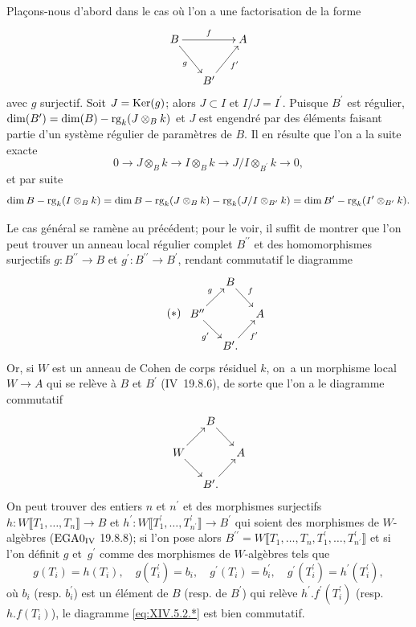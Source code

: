 Pla\c cons-nous d'abord dans le cas o\`u l'on a une factorisation de
la forme
$$
\xymatrix@C=15pt{ B\ar[rr]^-{f}\ar[rd]_-{g} & & A\\
& B^{\prime}\ar[ru]_-{f^{\prime}} & }$$
avec $g$ surjectif. Soit $J=\operatorname{Ker}(g)$; alors $J\subset I$ et $I/J=I^{\prime}$. Puisque $B^{\prime}$ est r\'egulier, $\dim(B^{\prime})=\dim(B)-\operatorname{rg}_{k}(J\otimes_{B}k)$ et $J$ est engendr\'e par des \'el\'ements faisant partie d'un syst\`eme r\'egulier de param\`etres de $B$. Il en r\'esulte que l'on a la suite exacte
$$0\to J\otimes_{B}k\to I\otimes_{B}k\to J/I\otimes_{B^{\prime}}k\to 0,
$$
et par suite
$$
\dim B-\operatorname{rg}_{k}(I\otimes_{B}k)=\dim B-\operatorname{rg}_{k}(J\otimes_{B}k)-\operatorname{rg}_{k}(J/I\otimes_{B^{\prime}}k)=\dim B^{\prime}-\operatorname{rg}_{k}(I^{\prime}\otimes_{B^{\prime}}k).
$$

Le cas g\'en\'eral se ram\`ene au pr\'ec\'edent; pour le voir, il suffit de montrer que l'on peut trouver un anneau local r\'egulier complet $B^{\prime\prime}$ et des homomorphismes surjectifs $g\colon B^{\prime\prime}\to B$ et $g^{\prime}\colon B^{\prime\prime}\to B^{\prime}$, rendant commutatif le diagramme
\begin{equation*} \label{eq:XIV.5.2.*} \tag{$*$}
\begin{array}{c}
\xymatrix@C=10pt@R=15pt{ & B\ar[rd]^-{f} & \\
B^{\prime\prime}\ar[ru]^-{g}\ar[rd]_-{g^{\prime}} & & A\\
& B^{\prime}.\ar[ru]_-{f^{\prime}} &
}
\end{array}
\end{equation*}
Or, si $W$ est un anneau de Cohen de corps r\'esiduel $k$, on~a un morphisme local $W\to A$ qui se rel\`eve \`a $B$ et $B^{\prime}$ (\EGA IV~19.8.6), de sorte que l'on a le diagramme commutatif
$$
\xymatrix@R=15pt@C=10pt{ & B\ar[rd] & \\
W\ar[ru]\ar[rd] & & A\\
& B^{\prime}.\ar[ru] & }$$
On peut trouver des entiers $n$ et $n^{\prime}$ et des morphismes surjectifs \hbox{$h\colon W\llbracket T_{1},\dots, T_{n}\rrbracket\!\to\! B$} et $h^{\prime}\colon W\llbracket T_{1}^{\prime},\dots, T_{n^{\prime}}^{\prime}\rrbracket\to B^{\prime}$ qui soient des morphismes de $W$-alg\`ebres ($\textup{EGA}\space 0_{\textup{IV}}$ 19.8.8); si l'on pose alors $B^{\prime\prime}=W\llbracket T_{1},\dots, T_{n}, T_{1}^{\prime},\dots, T_{n^{\prime}}^{\prime}\rrbracket$ et si l'on d\'efinit $g$ et~$g^{\prime}$ comme des morphismes de $W$-alg\`ebres tels que
$$g(T_{i})=h(T_{i}), \quad g(T_{i}^{\prime})=b_{i}, \quad g^{\prime}(T_{i})=b_{i}^{\prime}, \quad g^{\prime}(T_{i}^{\prime})=h^{\prime}(T_{i}^{\prime}),
$$
o\`u $b_{i}$ (resp. $b_{i}^{\prime}$) est un \'el\'ement de $B$ (resp. de $B^{\prime}$) qui rel\`eve $h^{\prime}.f^{\prime}(T_{i}^{\prime})$ (resp. $h.f(T_{i})$), le diagramme \eqref{eq:XIV.5.2.*} est bien commutatif.

